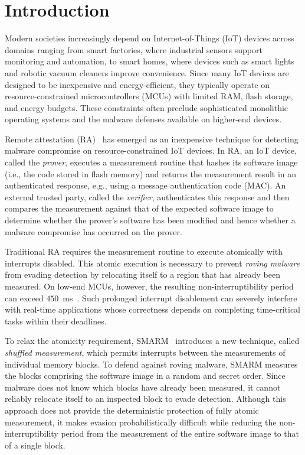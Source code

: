 \documentclass[conference]{IEEEtran}
\begin{document}
\section{Introduction}
\label{sec:intro}

Modern societies increasingly depend on Internet-of-Things (IoT) devices across domains ranging from smart factories, where industrial sensors support monitoring and automation, to smart homes, where devices such as smart lights and robotic vacuum cleaners improve convenience. 
Since many IoT devices are designed to be inexpensive and energy-efficient, they typically operate on resource-constrained microcontrollers (MCUs) with limited RAM, flash storage, and energy budgets. These constraints often preclude sophisticated monolithic operating systems and the malware defenses available on higher-end devices.

Remote attestation (RA)~\cite{eldefrawy2012smart,nunes2019vrased,eldefrawy2017hydra} has emerged as an inexpensive technique for detecting malware compromise on resource-constrained IoT devices. In RA, an IoT device, called the \emph{prover}, executes a measurement routine that hashes its software image (i.e., the code stored in flash memory) and returns the measurement result in an authenticated response, e.g., using a message authentication code (MAC). 
An external trusted party, called the \emph{verifier}, authenticates this response and then compares the measurement against that of the expected software image to determine whether the prover's software has been modified and hence whether a malware compromise has occurred on the prover.

Traditional RA requires the measurement routine to execute atomically with interrupts disabled. This atomic execution is necessary to prevent \emph{roving malware} from evading detection by relocating itself to a region that has already been measured. On low-end MCUs, however, the resulting non-interruptibility period can exceed $450$~ms~\cite{nunes2019vrased}. Such prolonged interrupt disablement can severely interfere with real-time applications whose correctness depends on completing time-critical tasks within their deadlines.

To relax the atomicity requirement, SMARM~\cite{carpent2018smarm} introduces a new technique, called \emph{shuffled measurement}, which permits interrupts between the measurements of individual memory blocks. To defend against roving malware, SMARM measures the blocks comprising the software image in a random and secret order. Since malware does not know which blocks have already been measured, it cannot reliably relocate itself to an inspected block to evade detection. Although this approach does not provide the deterministic protection of fully atomic measurement, it makes evasion probabilistically difficult while reducing the non-interruptibility period from the measurement of the entire software image to that of a single block.
\end{document}
